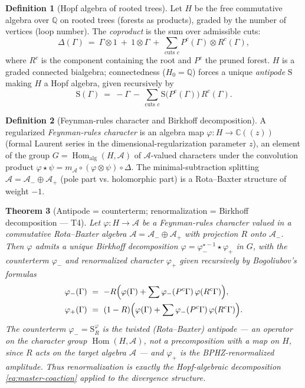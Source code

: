 \documentclass[12pt]{article}
\newtheorem{theorem}{Theorem}[section]
\theoremstyle{definition}
\newtheorem{definition}[theorem]{Definition}
\theoremstyle{remark}
\newcommand{\Hom}{\operatorname{Hom}}
\newcommand{\CC}{\mathbb{C}}
\newcommand{\QQ}{\mathbb{Q}}
\newcommand{\antipode}{\mathrm{S}}
\newcommand{\cop}{\Delta}
\begin{document}
\begin{definition}[Hopf algebra of rooted trees]
\label{def:ck}
Let $H$ be the free commutative algebra over $\QQ$ on rooted trees (forests as products),
graded by the number of vertices (loop number). The \emph{coproduct} is the sum over
admissible cuts:
\begin{equation}
\cop(\Gamma)\ =\ \Gamma\otimes 1\ +\ 1\otimes\Gamma\ +\ \sum_{\text{cuts } c}
P^c(\Gamma)\otimes R^c(\Gamma),
\label{eq:ck-coproduct}
\end{equation}
where $R^c$ is the component containing the root and $P^c$ the pruned forest. $H$ is a
graded connected bialgebra; connectedness ($H_0=\QQ$) forces a unique \emph{antipode}
$\antipode$ making $H$ a Hopf algebra, given recursively by
\begin{equation}
\antipode(\Gamma)\ =\ -\Gamma\ -\ \sum_{\text{cuts } c}\antipode\bigl(P^c(\Gamma)\bigr)\,
R^c(\Gamma).
\label{eq:ck-antipode}
\end{equation}
\end{definition}

\begin{definition}[Feynman-rules character and Birkhoff decomposition]
\label{def:character}
A regularized \emph{Feynman-rules character} is an algebra map
$\varphi:H\to\CC(\!(z)\!)$ (formal Laurent series in the dimensional-regularization parameter
$z$), an element of the group $G=\Hom_{\mathrm{alg}}(H,\mathcal A)$ of $\mathcal
A$-valued characters under the convolution product $\varphi\star\psi=m_{\mathcal
A}\circ(\varphi\otimes\psi)\circ\cop$. The minimal-subtraction splitting $\mathcal
A=\mathcal A_-\oplus\mathcal A_+$ (pole part vs. holomorphic part) is a Rota--Baxter
structure of weight $-1$.
\end{definition}

\begin{theorem}[Antipode = counterterm; renormalization = Birkhoff decomposition --- T4]
\label{thm:connes-kreimer}
Let $\varphi:H\to\mathcal A$ be a Feynman-rules character valued in a commutative
Rota--Baxter algebra $\mathcal A=\mathcal A_-\oplus\mathcal A_+$ with projection $R$ onto
$\mathcal A_-$. Then $\varphi$ admits a unique \emph{Birkhoff decomposition}
$\varphi=\varphi_-^{\star-1}\star\varphi_+$ in $G$, with the \emph{counterterm}
$\varphi_-$ and \emph{renormalized character} $\varphi_+$ given recursively by Bogoliubov's
formulas
\begin{align}
\varphi_-(\Gamma)\ &=\ -R\Bigl(\varphi(\Gamma)+\sum \varphi_-(P^c\Gamma)\,\varphi(R^c\Gamma)\Bigr),
\label{eq:bphz-minus}\\
\varphi_+(\Gamma)\ &=\ (1-R)\Bigl(\varphi(\Gamma)+\sum \varphi_-(P^c\Gamma)\,\varphi(R^c\Gamma)\Bigr).
\label{eq:bphz-plus}
\end{align}
The counterterm $\varphi_-=\antipode_R^{\varphi}$ is the twisted (Rota--Baxter) antipode
--- an operator on the character group $\Hom(H,\mathcal A)$, not a precomposition with a
map on $H$, since $R$ acts on the target algebra $\mathcal A$ --- and $\varphi_+$ is the
BPHZ-renormalized amplitude. Thus renormalization is exactly the Hopf-algebraic
decomposition \eqref{eq:master-coaction} applied to the divergence structure.
\end{theorem}
\end{document}
